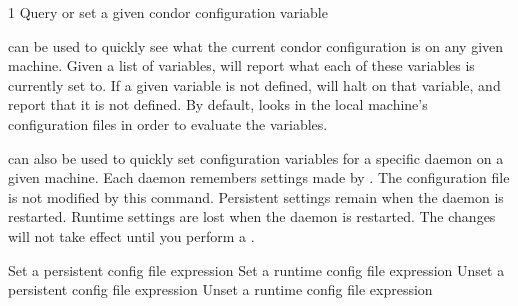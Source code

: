 \begin{ManPage}{\label{man-condor-config-val}}{1}
{Query or set a given condor configuration variable}
\Synopsis {}







\Description

 can be used to quickly see what the current
condor configuration is on any given machine.  Given a list of
variables,  will report what each of these
variables is currently set to.  If a given variable is not defined,
 will halt on that variable, and report that it is
not defined.  By default,  looks in the local
machine's configuration files in order to evaluate the variables.

 can also be used to quickly set configuration
variables for a specific daemon on a given machine.  Each daemon
remembers settings made by .  The configuration
file is not modified by this command.  Persistent settings remain when
the daemon is restarted.  Runtime settings are lost when the daemon is
restarted.  \Note The changes will not take effect until you perform a
.

\begin{Options}
	 { Set a persistent
	config file expression}
	 { Set a runtime
	config file expression}
	 { Unset a persistent
	config file expression}
	 { Unset a runtime
	config file expression}
\end{Options}


\end{ManPage}

